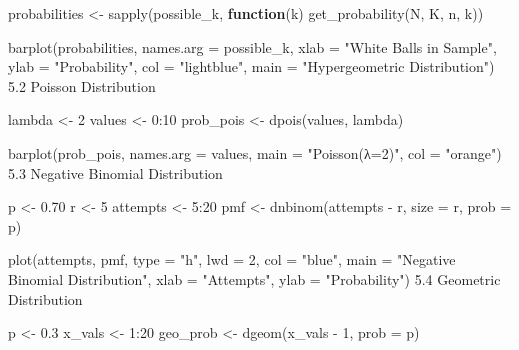 \documentclass[
  letterpaper,
  DIV=11,
  numbers=noendperiod]{scrreprt}
\newenvironment{Shaded}{\begin{snugshade}}{\end{snugshade}}
\newcommand{\AttributeTok}[1]{\textcolor[rgb]{0.40,0.45,0.13}{#1}}
\newcommand{\ControlFlowTok}[1]{\textcolor[rgb]{0.00,0.23,0.31}{\textbf{#1}}}
\newcommand{\DecValTok}[1]{\textcolor[rgb]{0.68,0.00,0.00}{#1}}
\newcommand{\FloatTok}[1]{\textcolor[rgb]{0.68,0.00,0.00}{#1}}
\newcommand{\FunctionTok}[1]{\textcolor[rgb]{0.28,0.35,0.67}{#1}}
\newcommand{\NormalTok}[1]{\textcolor[rgb]{0.00,0.23,0.31}{#1}}
\newcommand{\OtherTok}[1]{\textcolor[rgb]{0.00,0.23,0.31}{#1}}
\newcommand{\SpecialCharTok}[1]{\textcolor[rgb]{0.37,0.37,0.37}{#1}}
\newcommand{\StringTok}[1]{\textcolor[rgb]{0.13,0.47,0.30}{#1}}
\begin{document}
{\begin{Shaded}
\begin{Highlighting}[]
\NormalTok{probabilities }\OtherTok{\textless{}{-}} \FunctionTok{sapply}\NormalTok{(possible\_k, }\ControlFlowTok{function}\NormalTok{(k) }\FunctionTok{get\_probability}\NormalTok{(N, K, n, k))}

\FunctionTok{barplot}\NormalTok{(probabilities, }\AttributeTok{names.arg =}\NormalTok{ possible\_k,}
        \AttributeTok{xlab =} \StringTok{"White Balls in Sample"}\NormalTok{, }\AttributeTok{ylab =} \StringTok{"Probability"}\NormalTok{,}
        \AttributeTok{col =} \StringTok{"lightblue"}\NormalTok{, }\AttributeTok{main =} \StringTok{"Hypergeometric Distribution"}\NormalTok{)}
\FloatTok{5.2}\NormalTok{ Poisson Distribution}

\NormalTok{lambda }\OtherTok{\textless{}{-}} \DecValTok{2}
\NormalTok{values }\OtherTok{\textless{}{-}} \DecValTok{0}\SpecialCharTok{:}\DecValTok{10}
\NormalTok{prob\_pois }\OtherTok{\textless{}{-}} \FunctionTok{dpois}\NormalTok{(values, lambda)}

\FunctionTok{barplot}\NormalTok{(prob\_pois, }\AttributeTok{names.arg =}\NormalTok{ values,}
        \AttributeTok{main =} \StringTok{"Poisson(λ=2)"}\NormalTok{, }\AttributeTok{col =} \StringTok{"orange"}\NormalTok{)}
\FloatTok{5.3}\NormalTok{ Negative Binomial Distribution}

\NormalTok{p }\OtherTok{\textless{}{-}} \FloatTok{0.70}
\NormalTok{r }\OtherTok{\textless{}{-}} \DecValTok{5}
\NormalTok{attempts }\OtherTok{\textless{}{-}} \DecValTok{5}\SpecialCharTok{:}\DecValTok{20}
\NormalTok{pmf }\OtherTok{\textless{}{-}} \FunctionTok{dnbinom}\NormalTok{(attempts }\SpecialCharTok{{-}}\NormalTok{ r, }\AttributeTok{size =}\NormalTok{ r, }\AttributeTok{prob =}\NormalTok{ p)}

\FunctionTok{plot}\NormalTok{(attempts, pmf, }\AttributeTok{type =} \StringTok{"h"}\NormalTok{, }\AttributeTok{lwd =} \DecValTok{2}\NormalTok{, }\AttributeTok{col =} \StringTok{"blue"}\NormalTok{,}
     \AttributeTok{main =} \StringTok{"Negative Binomial Distribution"}\NormalTok{,}
     \AttributeTok{xlab =} \StringTok{"Attempts"}\NormalTok{, }\AttributeTok{ylab =} \StringTok{"Probability"}\NormalTok{)}
\FloatTok{5.4}\NormalTok{ Geometric Distribution}

\NormalTok{p }\OtherTok{\textless{}{-}} \FloatTok{0.3}
\NormalTok{x\_vals }\OtherTok{\textless{}{-}} \DecValTok{1}\SpecialCharTok{:}\DecValTok{20}
\NormalTok{geo\_prob }\OtherTok{\textless{}{-}} \FunctionTok{dgeom}\NormalTok{(x\_vals }\SpecialCharTok{{-}} \DecValTok{1}\NormalTok{, }\AttributeTok{prob =}\NormalTok{ p)}


\end{Highlighting}
\end{Shaded}}
\end{document}
